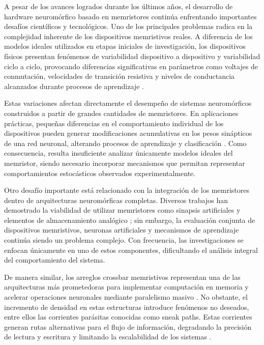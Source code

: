 A pesar de los avances logrados durante los últimos años, el desarrollo de hardware neuromórfico basado en memristores continúa enfrentando importantes desafíos científicos y tecnológicos. Uno de los principales problemas radica en la complejidad inherente de los dispositivos memristivos reales. A diferencia de los modelos ideales utilizados en etapas iniciales de investigación, los dispositivos físicos presentan fenómenos de variabilidad dispositivo a dispositivo y variabilidad ciclo a ciclo, provocando diferencias significativas en parámetros como voltajes de conmutación, velocidades de transición resistiva y niveles de conductancia alcanzados durante procesos de aprendizaje \cite{27,29,21}.

Estas variaciones afectan directamente el desempeño de sistemas neuromórficos construidos a partir de grandes cantidades de memristores. En aplicaciones prácticas, pequeñas diferencias en el comportamiento individual de los dispositivos pueden generar modificaciones acumulativas en los pesos sinápticos de una red neuronal, alterando procesos de aprendizaje y clasificación \cite{8,2}. Como consecuencia, resulta insuficiente analizar únicamente modelos ideales del memristor, siendo necesario incorporar mecanismos que permitan representar comportamientos estocásticos observados experimentalmente.

Otro desafío importante está relacionado con la integración de los memristores dentro de arquitecturas neuromórficas completas. Diversos trabajos han demostrado la viabilidad de utilizar memristores como sinapsis artificiales y elementos de almacenamiento analógico \cite{3,6}; sin embargo, la evaluación conjunta de dispositivos memristivos, neuronas artificiales y mecanismos de aprendizaje continúa siendo un problema complejo. Con frecuencia, las investigaciones se enfocan únicamente en uno de estos componentes, dificultando el análisis integral del comportamiento del sistema.

De manera similar, los arreglos crossbar memristivos representan una de las arquitecturas más prometedoras para implementar computación en memoria y acelerar operaciones neuronales mediante paralelismo masivo \cite{4,5}. No obstante, el incremento de densidad en estas estructuras introduce fenómenos no deseados, entre ellos las corrientes parásitas conocidas como sneak paths. Estas corrientes generan rutas alternativas para el flujo de información, degradando la precisión de lectura y escritura y limitando la escalabilidad de los sistemas \cite{7}.

